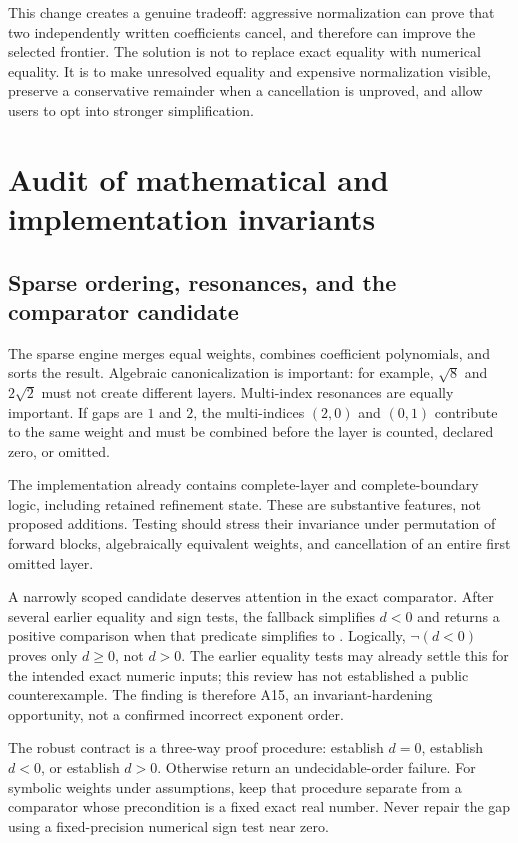 \documentclass[11pt,a4paper]{article}
\newcommand{\code}[1]{\texttt{\detokenize{#1}}}
\begin{document}
This change creates a genuine tradeoff: aggressive normalization can prove
that two independently written coefficients cancel, and therefore can
improve the selected frontier. The solution is not to replace exact equality
with numerical equality. It is to make unresolved equality and expensive
normalization visible, preserve a conservative remainder when a cancellation
is unproved, and allow users to opt into stronger simplification.

\section{Audit of mathematical and implementation invariants}
\label{sec:invariants}
\subsection{Sparse ordering, resonances, and the comparator candidate}
The sparse engine merges equal weights, combines coefficient polynomials,
and sorts the result. Algebraic canonicalization is important: for example,
$\sqrt8$ and $2\sqrt2$ must not create different layers. Multi-index
resonances are equally important. If gaps are $1$ and $2$, the multi-indices
$(2,0)$ and $(0,1)$ contribute to the same weight and must be combined before
the layer is counted, declared zero, or omitted.

The implementation already contains complete-layer and complete-boundary
logic, including retained refinement state. These are substantive features,
not proposed additions. Testing should stress their invariance under
permutation of forward blocks, algebraically equivalent weights, and
cancellation of an entire first omitted layer.
\cite{core,refinement,fourier}

A narrowly scoped candidate deserves attention in the exact comparator.
After several earlier equality and sign tests, the fallback simplifies
$d<0$ and returns a positive comparison when that predicate simplifies to
\code{False}. Logically, $\neg(d<0)$ proves only $d\geq0$, not $d>0$.
The earlier equality tests may already settle this for the intended exact
numeric inputs; this review has not established a public counterexample.
The finding is therefore A15, an invariant-hardening opportunity, not a
confirmed incorrect exponent order.
\cite{core}

The robust contract is a three-way proof procedure: establish $d=0$,
establish $d<0$, or establish $d>0$. Otherwise return an undecidable-order
failure. For symbolic weights under assumptions, keep that procedure
separate from a comparator whose precondition is a fixed exact real number.
Never repair the gap using a fixed-precision numerical sign test near zero.
\end{document}
